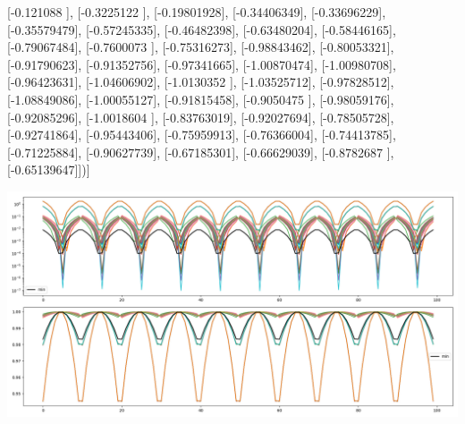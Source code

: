 \documentclass{article}
\begin{document}
       [-0.121088  ],
       [-0.3225122 ],
       [-0.19801928],
       [-0.34406349],
       [-0.33696229],
       [-0.35579479],
       [-0.57245335],
       [-0.46482398],
       [-0.63480204],
       [-0.58446165],
       [-0.79067484],
       [-0.7600073 ],
       [-0.75316273],
       [-0.98843462],
       [-0.80053321],
       [-0.91790623],
       [-0.91352756],
       [-0.97341665],
       [-1.00870474],
       [-1.00980708],
       [-0.96423631],
       [-1.04606902],
       [-1.0130352 ],
       [-1.03525712],
       [-0.97828512],
       [-1.08849086],
       [-1.00055127],
       [-0.91815458],
       [-0.9050475 ],
       [-0.98059176],
       [-0.92085296],
       [-1.0018604 ],
       [-0.83763019],
       [-0.92027694],
       [-0.78505728],
       [-0.92741864],
       [-0.95443406],
       [-0.75959913],
       [-0.76366004],
       [-0.74413785],
       [-0.71225884],
       [-0.90627739],
       [-0.67185301],
       [-0.66629039],
       [-0.8782687 ],
       [-0.65139647]])]
\begin{center}
\includegraphics[scale=.9]{control_dpn_all.png}

\end{center}
\end{document}

